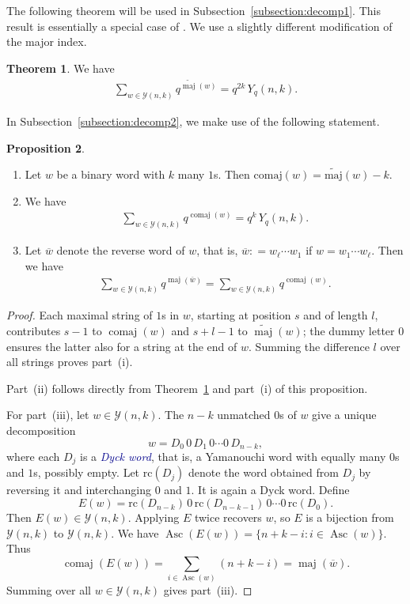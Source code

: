 \documentclass[11pt]{article}
\theoremstyle{definition}
\newtheorem{theorem}{Theorem}[section]
\newtheorem{proposition}[theorem]{Proposition}
\theoremstyle{remark}
\theoremstyle{definition}
\numberwithin{equation}{section}
\newcommand{\coloneq}{\mathrel{\mathop:}=}
\renewcommand\emph[1]{\textcolor{darkblue}{\it #1}}
\begin{document}
The following theorem will be used in
Subsection~\ref{subsection:decomp1}. This result is essentially a
special case of \cite[Theorem~5]{Kra89b}. We use a slightly different
modification of the major index.

\begin{theorem}\label{thm:Yam}
We have
\begin{align}\label{eq:q-Yam}
\sum_{w\in\mathcal{Y}(n,k)}q^{\widetilde{\operatorname{maj}}(w)} = q^{2k}\,Y_q(n,k).
\end{align}
\end{theorem}


In Subsection~\ref{subsection:decomp2}, we make use of the following
statement.

\begin{proposition}\label{prop:rev_maj}
\begin{enumerate}
\item Let $w$ be a binary word with $k$ many $1$s. Then $\mathrm{comaj}(w)=\widetilde{\mathrm{maj}}(w)-k$.
\item We have
\begin{align*}
\sum_{w\in\mathcal{Y}(n,k)}q^{\operatorname{comaj}(w)} = q^{k}\,Y_q(n,k).
\end{align*}
\item Let $\overline{w}$ denote the reverse word of $w$, that is, $\overline{w}\coloneq w_\ell\cdots w_1$ if $w=w_1\cdots w_\ell$. Then we have
\begin{align*}
\sum_{w\in\mathcal{Y}(n,k)}q^{\operatorname{maj}(\overline{w})} = 
\sum_{w\in\mathcal{Y}(n,k)}q^{\operatorname{comaj}(w)}.
\end{align*}
\end{enumerate}
\end{proposition}
\begin{proof}
  Each maximal string of $1$s in $w$, starting at position $s$ and of
  length $l$, contributes $s-1$ to $\operatorname{comaj}(w)$ and
  $s+l-1$ to $\widetilde{\operatorname{maj}}(w)$; the dummy letter $0$
  ensures the latter also for a string at the end of $w$. Summing the
  difference $l$ over all strings proves part~(i).

  Part~(ii) follows directly from Theorem~\ref{thm:Yam} and part~(i)
  of this proposition.

  For part~(iii), let $w\in\mathcal{Y}(n,k)$. The $n-k$ unmatched $0$s
  of $w$ give a unique decomposition
  \[
    w = D_0\,0\,D_1\,0\cdots0\,D_{n-k},
  \]
  where each $D_j$ is a \emph{Dyck word}, that is, a Yamanouchi word
  with equally many $0$s and $1$s, possibly empty. Let
  $\mathrm{rc}(D_j)$ denote the word obtained from $D_j$ by reversing
  it and interchanging $0$ and $1$. It is again a Dyck word. Define
  \[
    E(w) =
    \mathrm{rc}(D_{n-k})\,0\,\mathrm{rc}(D_{n-k-1})\,0\cdots0\,\mathrm{rc}(D_0).
  \]
  Then $E(w)\in\mathcal{Y}(n,k)$. Applying $E$ twice recovers $w$, so
  $E$ is a bijection from $\mathcal{Y}(n,k)$ to $\mathcal{Y}(n,k)$. We
  have
  $\operatorname{Asc}(E(w))=\{n+k-i : i\in\operatorname{Asc}(w)\}$.
  Thus
  \[
    \operatorname{comaj}(E(w)) = \sum_{i\in\operatorname{Asc}(w)}(n+k-i) = \operatorname{maj}(\overline{w}).
  \]
  Summing over all $w\in\mathcal{Y}(n,k)$ gives part~(iii).
\end{proof}
\end{document}
